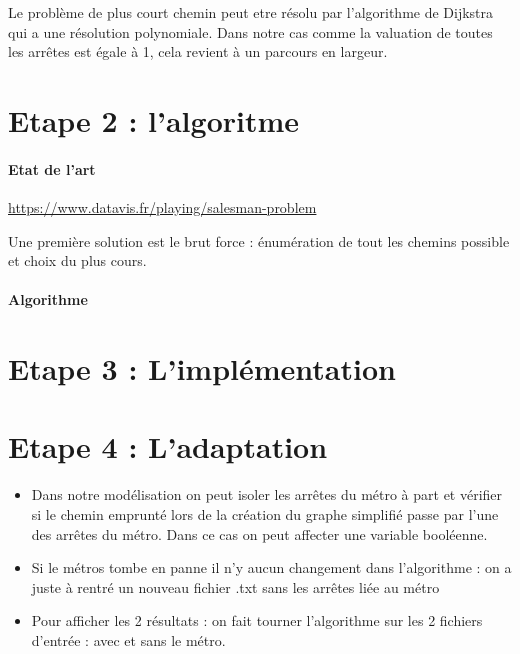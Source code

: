 \documentclass[11pt,a4paper]{article}
\begin{document}
\begin{itemize}
    Le problème de plus court chemin peut etre résolu par l'algorithme de Dijkstra qui a une résolution polynomiale. Dans notre cas comme la valuation de toutes les arrêtes est égale à 1, cela revient à un parcours en largeur.
\end{itemize}
\section{Etape 2 : l'algoritme}
\paragraph{Etat de l'art}
\url{https://www.datavis.fr/playing/salesman-problem}

Une première solution est le brut force : énumération de tout les chemins possible et choix du plus cours. 
\paragraph{Algorithme}

\section{Etape 3 : L'implémentation}
\section{Etape 4 : L'adaptation}
\begin{itemize}
    \item Dans notre modélisation on peut isoler les arrêtes du métro à part et vérifier si le chemin emprunté lors de la création du graphe simplifié passe par l'une des arrêtes du métro. 
    Dans ce cas on peut affecter une variable booléenne.
    \item Si le métros tombe en panne il n'y aucun changement dans l'algorithme : on a juste à rentré un nouveau fichier .txt sans les arrêtes liée au métro
    \item Pour afficher les 2 résultats : on fait tourner l'algorithme sur les 2 fichiers d'entrée : avec et sans le métro.
\end{itemize}
\end{document}
